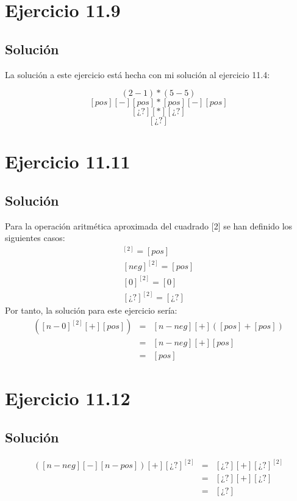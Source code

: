 \documentclass[11pt, a4paper, titlepage]{article}
\begin{document}
\section*{Ejercicio 11.9}
\subsection*{Solución}
La solución a este ejercicio está hecha con mi solución al ejercicio 11.4:

$$(2-1) * (5-5)$$
$$[pos] [-] [pos] * [pos] [-] [pos]$$
$$[\text{¿?}] [*] [\text{¿?}]$$
$$[\text{¿?}]$$

\section*{Ejercicio 11.11}
\subsection*{Solución}
Para la operación aritmética aproximada del cuadrado [2] se han definido los
siguientes casos:
\newline
\begin{align*}
  [pos]^{[2]} = [pos]\\
  [neg]^{[2]} = [pos]\\
  [0]^{[2]} = [0]\\
  [\text{¿?}]^{[2]} = [\text{¿?}]
\end{align*}
Por tanto, la solución para este ejercicio sería:
\begin{align*}
  [n-neg][+]([n-0]^{[2]}[+][pos]) & = & [n-neg][+]([pos]+[pos])
  \\
  & = & [n-neg][+][pos]
  \\
  & = &[pos]
\end{align*}
\section*{Ejercicio 11.12}
\subsection*{Solución}
\begin{align*}
  ([n-neg][−][n-pos])[+][\text{¿?}]^{[2]} & = & [\text{¿?}][+][\text{¿?}]^{[2]}
  \\
  & = & [\text{¿?}][+][\text{¿?}]
  \\
  & = & [\text{¿?}]
\end{align*}
\end{document}
